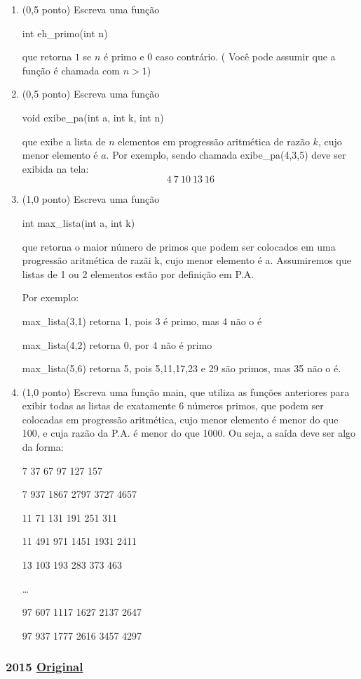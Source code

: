 \documentclass[12pt,a4paper]{article}
\newcommand{\original}[1]{\tiny \href{#1}{Original} \normalsize}
\begin{document}
\begin{enumerate}[label=\alph*)]
\item (0,5 ponto) Escreva uma função 

int eh\_primo(int n)

que retorna $1$ se $n$ é primo e $0$ caso contrário. ( Você pode assumir que a função é chamada com $n>1$)
 
\item (0,5 ponto) Escreva uma função

void exibe\_pa(int a, int k, int n)

que exibe a lista de $n$ elementos em progressão aritmética de razão $k$, cujo menor elemento é $a$. Por exemplo, sendo chamada
exibe\_pa(4,3,5) deve ser exibida na tela: 
$$4\ 7\ 10\ 13\ 16$$
\item (1,0 ponto) Escreva uma função

int max\_lista(int a, int k)

que retorna o maior número de primos que podem ser colocados em uma progressão aritmética de razãi k, cujo menor elemento é a. Assumiremos 
que listas de 1 ou 2 elementos estão por definição em P.A. 

Por exemplo:

max\_lista(3,1) retorna 1, pois 3 é primo, mas 4 não o é

max\_lista(4,2) retorna 0, por 4 não é primo

max\_lista(5,6) retorna 5, pois 5,11,17,23 e 29 são primos, mas 35 não o é.

\item (1,0 ponto) Escreva uma função main, que utiliza as funções anteriores para exibir todas as listas de exatamente 6 
números primos, que podem ser colocadas em progressão aritmética, cujo menor elemento é menor do que 100, e cuja razão da P.A. é menor do que 1000. 
Ou seja, a saída deve ser algo da forma:

7 37 67 97 127 157

7 937 1867 2797 3727 4657

11 71 131 191 251 311

11 491 971 1451 1931 2411

13 103 193 283 373 463

\dots

97 607 1117 1627 2137 2647

97 937 1777 2616 3457 4297
\end{enumerate}

\newpage
\subsubsection{2015 \original{https://drive.google.com/file/d/1kst8BroXERfp2S3HeuKB6Ollk7w_jhcO/view?usp=sharing}}
\end{document}
